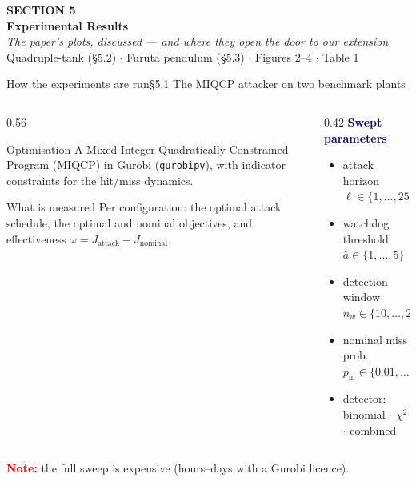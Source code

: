 \documentclass[aspectratio=169,10pt]{beamer}
\begin{document}
{
\begin{frame}[plain]
  \vfill
  \centering
  {\color{gold}\large\textbf{SECTION 5}}\\[1.2em]
  {\color{white}\Huge\textbf{Experimental Results}}\\[1.0em]
  {\color{light}\large\itshape The paper's plots, discussed --- and where they open the door to our extension}\\[1.2em]
  {\color{muted}\normalsize Quadruple-tank (\S5.2) $\cdot$ Furuta pendulum (\S5.3) $\cdot$ Figures 2--4 $\cdot$ Table 1}
  \vfill
\end{frame}}

\begin{frame}{How the experiments are run}{\S5.1 \quad The MIQCP attacker on two benchmark plants}
  \begin{columns}[T]
    \begin{column}{0.56\textwidth}
      \begin{block}{Optimisation}
        A Mixed-Integer Quadratically-Constrained Program (MIQCP) in Gurobi (\texttt{gurobipy}), with indicator constraints for the hit/miss dynamics.
      \end{block}
      \begin{block}{What is measured}
        Per configuration: the optimal attack schedule, the optimal and nominal objectives, and effectiveness $\omega = J_{\text{attack}} - J_{\text{nominal}}$.
      \end{block}
    \end{column}
    \begin{column}{0.42\textwidth}
      \textbf{\textcolor{navy}{Swept parameters}}
      \begin{itemize}
        \item attack horizon $\ell \in \{1,\dots,25\}$
        \item watchdog threshold $\bar a \in \{1,\dots,5\}$
        \item detection window $n_w \in \{10,\dots,20\}$
        \item nominal miss prob.\ $\hat p_{\mathrm m} \in \{0.01,\dots,0.25\}$
        \item detector: binomial $\cdot$ $\chi^2$ $\cdot$ combined
      \end{itemize}
    \end{column}
  \end{columns}
  \medskip
  {\footnotesize\textcolor{red}{\textbf{Note:}} the full sweep is expensive (hours--days with a Gurobi licence).}
\end{frame}
\end{document}
